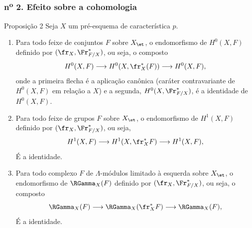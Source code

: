 \subsubsection*{n\textsuperscript{o} 2. Efeito sobre a cohomologia}

\begin{statement}{Proposição 2}
Seja $X$ um pré-esquema de característica $p$.
\begin{enumerate}[label=\alph*)]
\item Para todo feixe de conjuntos $F$ sobre $X_{\et}$, o endomorfismo de $H^0(X,F)$ definido por $(\fr_X,\Fr^*_{F/X})$, ou seja, o composto
\[
H^0(X,F)\longrightarrow H^0(X,\fr_X^*(F))\longrightarrow H^0(X,F),
\]
onde a primeira flecha é a aplicação canônica (caráter contravariante de $H^0(X,F)$ em relação a $X$) e a segunda, $H^0(X,\Fr^*_{F/X})$, é a identidade de $H^0(X,F)$.
\item Para todo feixe de grupos $F$ sobre $X_{\et}$, o endomorfismo de $H^1(X,F)$ definido por $(\fr_X,\Fr^*_{F/X})$, ou seja,
\[
H^1(X,F)\longrightarrow H^1(X,\fr_X^*F)\longrightarrow H^1(X,F),
\]
É a identidade.
\item Para todo complexo $F$ de $\Lambda$-módulos limitado à esquerda sobre $X_{\et}$, o endomorfismo de $\RGamma_X(F)$ definido por $(\fr_X,\Fr^*_{F/X})$, ou seja, o composto
\[
\RGamma_X(F)\longrightarrow \RGamma_X(\fr_X^*F)\longrightarrow \RGamma_X(F),
\]
É a identidade.
\end{enumerate}
\end{statement}
